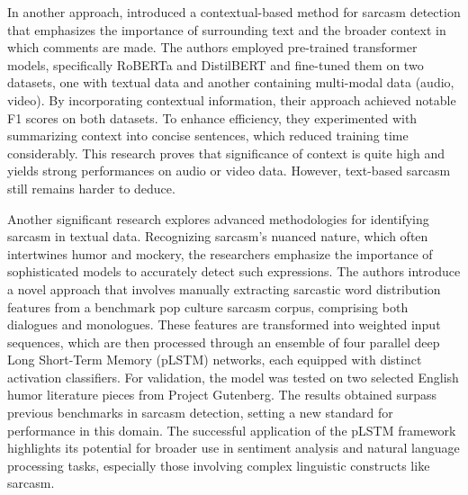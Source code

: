 In another approach, \cite{Helal_2024} introduced a contextual-based method for sarcasm detection that emphasizes the importance of surrounding text and the broader context in which comments 
are made. The authors employed pre-trained transformer models, specifically RoBERTa and DistilBERT and fine-tuned them on two datasets, one with textual data and another containing multi-modal 
data (audio, video). By incorporating contextual information, their approach achieved notable F1 scores on both datasets. To enhance efficiency, they experimented with summarizing context into 
concise sentences, which reduced training time considerably. This research proves that significance of context is quite high and yields strong performances on audio or video data. However, 
text-based sarcasm still remains harder to deduce.

Another significant research \cite{Das_2021} explores advanced methodologies for identifying sarcasm in textual data.
Recognizing sarcasm's nuanced nature, which often intertwines humor and mockery, the researchers emphasize the importance of sophisticated models to accurately detect such expressions. 
The authors introduce a novel approach that involves manually extracting sarcastic word distribution features from a benchmark pop culture sarcasm corpus, comprising both dialogues and monologues. 
These features are transformed into weighted input sequences, which are then processed through an ensemble of four parallel deep Long Short-Term Memory (pLSTM) networks, each equipped with 
distinct activation classifiers. For validation, the model was tested on two selected English humor literature pieces from Project Gutenberg. The results obtained surpass previous benchmarks in 
sarcasm detection, setting a new standard for performance in this domain. The successful application of the pLSTM framework highlights its potential for broader use in sentiment analysis and 
natural language processing tasks, especially those involving complex linguistic constructs like sarcasm.
